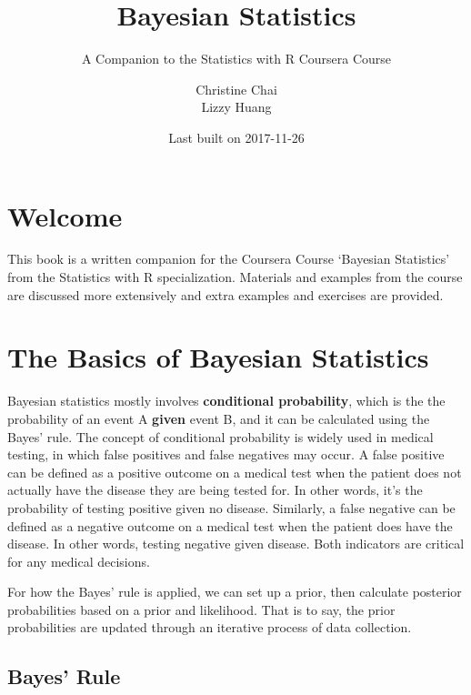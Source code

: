 \documentclass[]{book}
\title{Bayesian Statistics}
\subtitle{A Companion to the Statistics with R Coursera Course}
\author{Christine Chai \\ Lizzy Huang}
\date{Last built on 2017-11-26}
\theoremstyle{definition}
\theoremstyle{definition}
\theoremstyle{definition}
\theoremstyle{remark}
\begin{document}
\maketitle

{
\setcounter{tocdepth}{1}
\tableofcontents
}
\chapter*{Welcome}\label{welcome}

\newcommand{\No}{\textsf{N}}
\newcommand{\Ga}{\textsf{Gamma}}
\newcommand{\St}{\textsf{t}}
\newcommand{\NoGa}{\textsf{NormalGamma}}
\newcommand{\BF}{\textsf{BF}}
\newcommand{\data}{\text{data}}
\newcommand{\iid}{\mathrel{\mathop{\sim}\limits^{\rm iid}}}
\newcommand{\Ca}{\textsf{C}}



This book is a written companion for the Coursera Course `Bayesian
Statistics' from the Statistics with R specialization. Materials and
examples from the course are discussed more extensively and extra
examples and exercises are provided.

\chapter{The Basics of Bayesian
Statistics}\label{the-basics-of-bayesian-statistics}

Bayesian statistics mostly involves \textbf{conditional probability},
which is the the probability of an event A \textbf{given} event B, and
it can be calculated using the Bayes' rule. The concept of conditional
probability is widely used in medical testing, in which false positives
and false negatives may occur. A false positive can be defined as a
positive outcome on a medical test when the patient does not actually
have the disease they are being tested for. In other words, it's the
probability of testing positive given no disease. Similarly, a false
negative can be defined as a negative outcome on a medical test when the
patient does have the disease. In other words, testing negative given
disease. Both indicators are critical for any medical decisions.

For how the Bayes' rule is applied, we can set up a prior, then
calculate posterior probabilities based on a prior and likelihood. That
is to say, the prior probabilities are updated through an iterative
process of data collection.

\section{Bayes' Rule}\label{bayes-rule}
\end{document}
